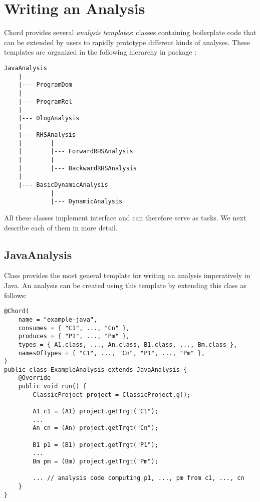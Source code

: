 \chapter{Writing an Analysis}
\label{chap:writing-analysis}

Chord provides several {\it analysis templates}: classes containing boilerplate
code that can be extended by users to rapidly prototype different kinds of
analyses.  These templates are organized in the following hierarchy in
package :

\begin{verbatim}
JavaAnalysis
    |
    |--- ProgramDom
    |
    |--- ProgramRel
    |
    |--- DlogAnalysis
    |
    |--- RHSAnalysis
    |        |
    |        |--- ForwardRHSAnalysis
    |        |
    |        |--- BackwardRHSAnalysis
    |
    |--- BasicDynamicAnalysis
             |
             |--- DynamicAnalysis
\end{verbatim}

All these classes implement
interface  and can
therefore serve as tasks.  We next describe each of them in more detail.

\section{JavaAnalysis}
\label{sec:java-analysis}

Class  provides the most general
template for writing an analysis imperatively in Java.  An analysis can be
created using this template by extending this class as follows:

\begin{verbatim}
@Chord(
    name = "example-java",
    consumes = { "C1", ..., "Cn" },
    produces = { "P1", ..., "Pm" },
    types = { A1.class, ..., An.class, B1.class, ..., Bm.class },
    namesOfTypes = { "C1", ..., "Cn", "P1", ..., "Pm" },
)
public class ExampleAnalysis extends JavaAnalysis {
    @Override
    public void run() {
        ClassicProject project = ClassicProject.g();

        A1 c1 = (A1) project.getTrgt("C1");
        ...
        An cn = (An) project.getTrgt("Cn");

        B1 p1 = (B1) project.getTrgt("P1");
        ...
        Bm pm = (Bm) project.getTrgt("Pm");

        ... // analysis code computing p1, ..., pm from c1, ..., cn
    }
}
\end{verbatim}

